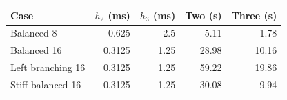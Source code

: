 \begin{tabular}{lrrrr}\toprule
Case & $h_2$ (ms) & $h_3$ (ms) & Two (s) & Three (s)\\\midrule
Balanced 8 & 0.625 & 2.5 & 5.11 & 1.78 \\
Balanced 16 & 0.3125 & 1.25 & 28.98 & 10.16 \\
Left branching 16 & 0.3125 & 1.25 & 59.22 & 19.86 \\
Stiff balanced 16 & 0.3125 & 1.25 & 30.08 & 9.94 \\
\bottomrule\end{tabular}
